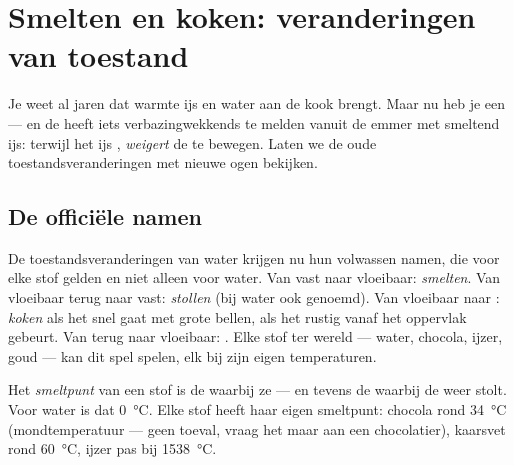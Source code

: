 \chapter{Smelten en koken: veranderingen van toestand}\label{ch:g4:changes-of-state}

Je weet al jaren dat warmte ijs  en water aan de kook brengt. Maar
nu heb je een  --- en de  heeft iets
verbazingwekkends te melden vanuit de emmer met smeltend ijs: terwijl
het ijs , \emph{weigert} de  te bewegen. Laten we de
oude toestandsveranderingen met nieuwe ogen bekijken.

\section{De officiële namen}

De toestandsveranderingen van water krijgen nu hun volwassen namen, die
voor elke stof gelden en niet alleen voor water. Van vast naar
vloeibaar: \emph{smelten}. Van vloeibaar terug naar
vast: \emph{stollen} (bij water ook 
genoemd). Van vloeibaar naar : \emph{koken} als het
snel gaat met grote bellen,  als het rustig vanaf het
oppervlak gebeurt. Van  terug naar vloeibaar: . Elke
stof ter wereld --- water, chocola, ijzer, goud --- kan dit spel
spelen, elk bij zijn eigen temperaturen.

\begin{definition}[Smeltpunt]\label{def:g4:changes-of-state:melting-point}
Het \emph{smeltpunt} van een stof is de
 waarbij ze  --- en tevens de  waarbij de
 weer stolt. Voor water is dat \qty{0}{\celsius}. Elke stof
heeft haar eigen smeltpunt: chocola  rond \qty{34}{\celsius}
(mondtemperatuur --- geen toeval, vraag het maar aan een chocolatier),
kaarsvet rond \qty{60}{\celsius}, ijzer pas bij \qty{1538}{\celsius}.
\end{definition}

